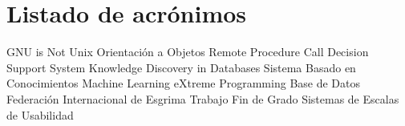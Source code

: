 \chapter{Listado de acrónimos}

{\small
\begin{acronym}[XXXXXXXX]
       {\acs{GNU} is Not Unix}
        {Orientación a Objetos}
       {Remote Procedure Call}
       {Decision Support System}
       {Knowledge Discovery in Databases}
       {Sistema Basado en Conocimientos}
        {Machine Learning}
        {eXtreme Programming}
      {Base de Datos}
       {Federación Internacional de Esgrima}
       {Trabajo Fin de Grado}
       {Sistemas de Escalas de Usabilidad}
\end{acronym}
}




